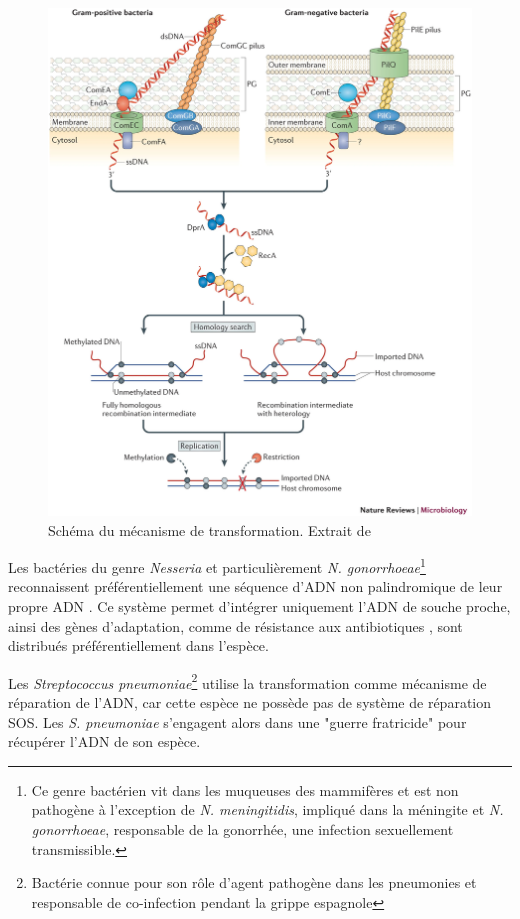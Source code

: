 \begin{figure}[htbp]
    \centering
    \includegraphics[width=0.8\linewidth]{images/transformation.png}
    \caption[Schéma du mécanisme de transformation]{Schéma du mécanisme de transformation. Extrait de \cite{johnston_bacterial_2014}}
    \label{fig:transformation}
\end{figure}

Les bactéries du genre \textit{Nesseria} et particulièrement \textit{N. gonorrhoeae}\footnote{Ce genre bactérien vit dans les muqueuses des mammifères et est non pathogène à l'exception de \textit{N. meningitidis}, impliqué dans la méningite et \textit{N. gonorrhoeae}, responsable de la gonorrhée, une infection sexuellement transmissible.} reconnaissent préférentiellement une séquence d'ADN non palindromique de leur propre ADN \cite{goodman_identification_1988,duffin_dna_2010}. Ce système permet d'intégrer uniquement l'ADN de souche proche, ainsi des gènes d'adaptation, comme de résistance aux antibiotiques \cite{centers_for_disease_control_and_prevention_cdc_update_2007}, sont distribués préférentiellement dans l'espèce.

Les \textit{Streptococcus pneumoniae}\footnote{Bactérie connue pour son rôle d'agent pathogène dans les pneumonies et responsable de co-infection pendant la grippe espagnole} utilise la transformation comme mécanisme de réparation de l'ADN, car cette espèce ne possède pas de système de réparation SOS. Les \textit{S. pneumoniae} s'engagent alors dans une "guerre fratricide" pour récupérer l'ADN de son espèce.

